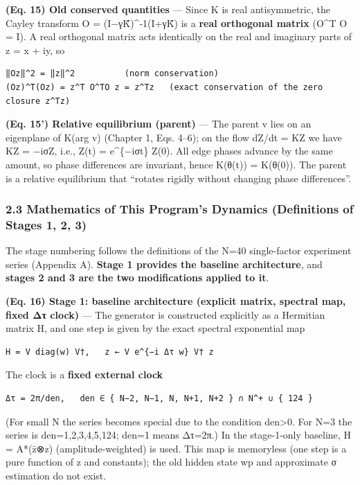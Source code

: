 \documentclass[
  a4paper,
]{ltjsarticle}
\begin{document}
\textbf{(Eq. 15) Old conserved quantities} --- Since K is real
antisymmetric, the Cayley transform O = (I−γK̃)\^{}-1(I+γK̃) is a
\textbf{real orthogonal matrix} (O\^{}T O = I). A real orthogonal matrix
acts identically on the real and imaginary parts of z = x + iy, so

\begin{verbatim}
‖Oz‖^2 = ‖z‖^2          (norm conservation)
(Oz)^T(Oz) = z^T O^TO z = z^Tz   (exact conservation of the zero closure z^Tz)
\end{verbatim}

\textbf{(Eq. 15') Relative equilibrium (parent)} --- The parent v lies
on an eigenplane of K(arg v) (Chapter 1, Eqs. 4--6); on the flow dZ/dt =
KZ we have KZ = −iσZ, i.e., Z(t) = e\^{}\{−iσt\} Z(0). All edge phases
advance by the same amount, so phase differences are invariant, hence
K(θ(t)) = K(θ(0)). The parent is a relative equilibrium that ``rotates
rigidly without changing phase differences''.

\subsubsection{2.3 Mathematics of This Program's Dynamics (Definitions
of Stages 1, 2,
3)}\label{mathematics-of-this-programs-dynamics-definitions-of-stages-1-2-3}

The stage numbering follows the definitions of the N=40 single-factor
experiment series (Appendix A). \textbf{Stage 1 provides the baseline
architecture}, and \textbf{stages 2 and 3 are the two modifications
applied to it}.

\textbf{(Eq. 16) Stage 1: baseline architecture (explicit matrix,
spectral map, fixed Δτ clock)} --- The generator is constructed
explicitly as a Hermitian matrix H, and one step is given by the exact
spectral exponential map

\begin{verbatim}
H = V diag(w) V†,   z ← V e^{−i Δτ w} V† z
\end{verbatim}

The clock is a \textbf{fixed external clock}

\begin{verbatim}
Δτ = 2π/den,   den ∈ { N−2, N−1, N, N+1, N+2 } ∩ N^+ ∪ { 124 }
\end{verbatim}

(For small N the series becomes special due to the condition
den\textgreater0. For N=3 the series is den=1,2,3,4,5,124; den=1 means
Δτ=2π.) In the stage-1-only baseline, H = A*(z̄⊗z) (amplitude-weighted)
is used. This map is memoryless (one step is a pure function of z and
constants); the old hidden state wp and approximate σ estimation do not
exist.
\end{document}
